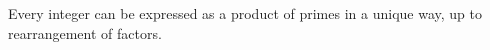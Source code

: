 Every integer can be expressed as a product of primes in a unique
way, up to rearrangement of factors.



